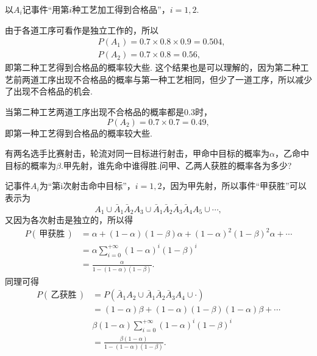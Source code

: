 \begin{solution}
  以$A_i$记事件“用第$i$种工艺加工得到合格品”，$i=1,2$.

  \begin{inparaenum}[(1)]
    \item 由于各道工序可看作是独立工作的，所以
    \begin{align*}
      & P(A_1) = 0.7\times 0.8 \times 0.9 = 0.504, \\
      & P(A_2) = 0.7\times 0.8 = 0.56,
    \end{align*}
    即第二种工艺得到合格品的概率较大些. 这个结果也是可以理解的，因为第二种工艺前两道工序出现不合格品的概率与第一种工艺相同，但少了一道工序，所以减少了出现不合格品的机会.

    \item 当第二种工艺两道工序出现不合格品的概率都是0.3时，
    \[
      P(A_2) = 0.7\times 0.7 = 0.49,
    \]
    即第一种工艺得到合格品的概率较大些.
  \end{inparaenum}
\end{solution}

\begin{example}
  有两名选手比赛射击，轮流对同一目标进行射击，甲命中目标的概率为$\alpha$，乙命中目标的概率为$\beta$.甲先射，谁先命中谁得胜.问甲、乙两人获胜的概率各为多少?
\end{example}
\begin{solution}
  记事件$A_i$为“第i次射击命中目标”，$i=1,2$，因为甲先射，所以事件“甲获胜”可以表示为
  \[
    A_1 \cup \bar A_1\bar A_2 A_3 \cup \bar A_1\bar A_2
    \bar A_3\bar A_4A_5\cup\cdots,
  \]
  又因为各次射击是独立的，所以得
  \begin{align*}
    P(\,\text{甲获胜}\,) & = \alpha + (1-\alpha)(1-\beta)\alpha + (1-\alpha)^2(1-\beta)^2\alpha + \cdots \\
    & = \alpha\sum_{i=0}^{+\infty}(1-\alpha)^i(1-\beta)^i \\
    & = \frac{\alpha}{1-(1-\alpha)(1-\beta)}.
  \end{align*}
  同理可得
  \begin{align*}
    P(\,\text{乙获胜}\,) & = P (\bar A_1A_2\cup \bar A_1\bar A_2\bar A_3A_4\cup\cdot) \\
    & = (1-\alpha)\beta + (1-\alpha)(1-\beta)(1-\alpha)\beta + \cdots \\
    & \beta (1-\alpha)\sum_{i=0}^{+\infty}(1-\alpha)^i(1-\beta)^i \\
    & = \frac{\beta(1-\alpha)}{1-(1-\alpha)(1-\beta)}.
  \end{align*}
\end{solution}

